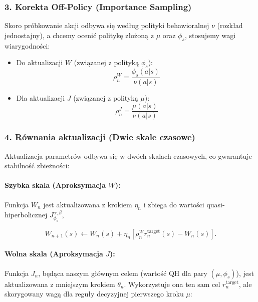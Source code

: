 \subsubsection*{3. Korekta Off-Policy (Importance Sampling)}

Skoro próbkowanie akcji odbywa się według polityki behawioralnej $\nu$ (rozkład jednostajny), a chcemy ocenić politykę złożoną z $\mu$ oraz $\phi_s$, stosujemy wagi wiarygodności:

\begin{itemize}
    \item Do aktualizacji $W$ (związanej z polityką $\phi_s$):
    \begin{equation}
        \rho_n^W = \frac{\phi_s(a|s)}{\nu(a|s)}
    \end{equation}
    \item Dla aktualizacji $J$ (związanej z polityką $\mu$):
    \begin{equation}
        \rho_n^J = \frac{\mu(a|s)}{\nu(a|s)}
    \end{equation}
\end{itemize}

\subsubsection*{4. Równania aktualizacji (Dwie skale czasowe)}

Aktualizacja parametrów odbywa się w dwóch skalach czasowych, co gwarantuje stabilność zbieżności:

\paragraph{Szybka skala (Aproksymacja $W$):} Funkcja $W_n$ jest aktualizowana z krokiem $\eta_n$ i zbiega do wartości quasi-hiperbolicznej $J^{\alpha,\beta}_{\phi_s}$,

\begin{equation}
    W_{n+1}(s) \leftarrow W_{n}(s) + \eta_{n} \left[ \rho_n^W r_{n}^{\text{target}}(s) - W_{n}(s) \right].
    \label{eq:update_W}
\end{equation}

\paragraph{Wolna skala (Aproksymacja $J$):} Funkcja $J_n$, będąca naszym głównym celem (wartość QH dla pary $(\mu, \phi_s)$), jest aktualizowana z mniejszym krokiem $\theta_n$. Wykorzystuje ona ten sam cel $r_n^{\text{target}}$, ale skorygowany wagą dla reguły decyzyjnej pierwszego kroku $\mu$:

